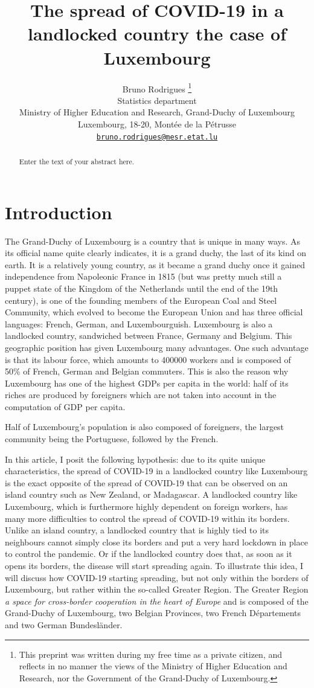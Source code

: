 \documentclass{article}
\title{The spread of COVID-19 in a landlocked country the case of
Luxembourg}
\author{
    Bruno Rodrigues
    \thanks{This preprint was written during my free time as a private
citizen, and reflects in no manner the views of the Ministry of Higher
Education and Research, nor the Government of the Grand-Duchy of
Luxembourg.}
   \\
    Statistics department \\
    Ministry of Higher Education and Research, Grand-Duchy of
Luxembourg \\
  Luxembourg, 18-20, Montée de la Pétrusse \\
  \texttt{\href{mailto:bruno.rodrigues@mesr.etat.lu}{\nolinkurl{bruno.rodrigues@mesr.etat.lu}}} \\
  }
\begin{document}
\maketitle

\def\tightlist{}


\begin{abstract}
Enter the text of your abstract here.
\end{abstract}


\hypertarget{introduction}{%
\section{Introduction}\label{introduction}}

The Grand-Duchy of Luxembourg is a country that is unique in many ways.
As its official name quite clearly indicates, it is a grand duchy, the
last of its kind on earth. It is a relatively young country, as it
became a grand duchy once it gained independence from Napoleonic France
in 1815 (but was pretty much still a puppet state of the Kingdom of the
Netherlands until the end of the 19th century), is one of the founding
members of the European Coal and Steel Community, which evolved to
become the European Union and has three official languages: French,
German, and Luxembourguish. Luxembourg is also a landlocked country,
sandwiched between France, Germany and Belgium. This geographic position
has given Luxembourg many advantages. One such advantage is that its
labour force, which amounts to 400000 workers and is composed of 50\% of
French, German and Belgian commuters. This is also the reason why
Luxembourg has one of the highest GDPs per capita in the world: half of
its riches are produced by foreigners which are not taken into account
in the computation of GDP per capita.

Half of Luxembourg's population is also composed of foreigners, the
largest community being the Portuguese, followed by the French.

In this article, I posit the following hypothesis: due to its quite
unique characteristics, the spread of COVID-19 in a landlocked country
like Luxembourg is the exact opposite of the spread of COVID-19 that can
be observed on an island country such as New Zealand, or Madagascar. A
landlocked country like Luxembourg, which is furthermore highly
dependent on foreign workers, has many more difficulties to control the
spread of COVID-19 within its borders. Unlike an island country, a
landlocked country that is highly tied to its neighbours cannot simply
close its borders and put a very hard lockdown in place to control the
pandemic. Or if the landlocked country does that, as soon as it opens
its borders, the disease will start spreading again. To illustrate this
idea, I will discuss how COVID-19 starting spreading, but not only
within the borders of Luxembourg, but rather within the so-called
Greater Region. The Greater Region \emph{a space for cross-border
cooperation in the heart of Europe} and is composed of the Grand-Duchy
of Luxembourg, two Belgian Provinces, two French Départements and two
German Bundesländer.
\end{document}
